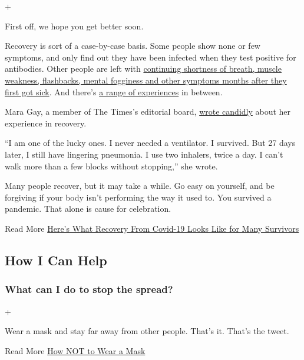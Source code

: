 +

First off, we hope you get better soon.

Recovery is sort of a case-by-case basis. Some people show none or few
symptoms, and only find out they have been infected when they test
positive for antibodies. Other people are left with
\href{https://www.nytimes3xbfgragh.onion/2020/05/10/world/europe/coronavirus-italy-recovery.html}{continuing
shortness of breath, muscle weakness, flashbacks, mental fogginess and
other symptoms months after they first got sick}. And there's
\href{https://www.nytimes3xbfgragh.onion/2020/03/04/us/coronavirus-recovery.html}{a
range of experiences} in between.

Mara Gay, a member of The Times's editorial board,
\href{https://www.nytimes3xbfgragh.onion/2020/05/14/opinion/coronavirus-young-people.html}{wrote
candidly} about her experience in recovery.

``I am one of the lucky ones. I never needed a ventilator. I survived.
But 27 days later, I still have lingering pneumonia. I use two inhalers,
twice a day. I can't walk more than a few blocks without stopping,'' she
wrote.

Many people recover, but it may take a while. Go easy on yourself, and
be forgiving if your body isn't performing the way it used to. You
survived a pandemic. That alone is cause for celebration.

 Read More
\href{https://www.nytimes3xbfgragh.onion/2020/07/01/health/coronavirus-recovery-survivors.html}{Here's
What Recovery From Covid-19 Looks Like for Many Survivors}

\hypertarget{how-i-can-help}{%
\subsection{How I Can Help}\label{how-i-can-help}}

\hypertarget{what-can-i-do-to-stop-the-spread}{%
\subsubsection{What can I do to stop the
spread?}\label{what-can-i-do-to-stop-the-spread}}

+

Wear a mask and stay far away from other people. That's it. That's the
tweet.

 Read More
\href{https://www.nytimes3xbfgragh.onion/2020/04/08/well/live/coronavirus-face-mask-mistakes.html}{How
NOT to Wear a Mask}

